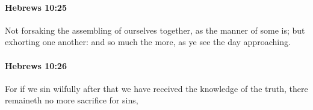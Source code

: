 		\paragraph{Hebrews 10:25} %
			\label{HEBREWS-10-25}

			Not forsaking the assembling of ourselves together, as the manner of some is; but exhorting one another: and so much the more, as ye see the day approaching.

			\begin{framed}
			\scriptsize
				\begin{compactdesc}
					\item[SBLG] 
				\end{compactdesc}
			\end{framed}

		\paragraph{Hebrews 10:26} %
			\label{HEBREWS-10-26}

			For if we sin wilfully after that we have received the knowledge of the truth, there remaineth no more sacrifice for sins,

